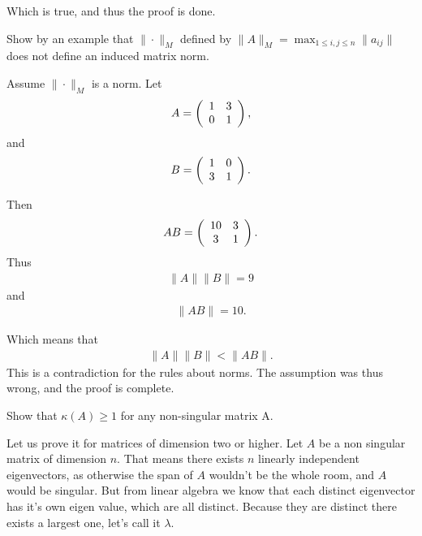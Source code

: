 \documentclass[10pt]{article}
\begin{document}
\begin{solution}[4]
Which is true, and thus the proof is done.
\end{solution}
\begin{exercise}[5]  \label{exe:5}
Show by an example that \(\| \cdot \| _{M}\) defined by
\(\| A \| _{M} = \max_{1\leq i,j \leq n} \| a _{ij} \|\) does not define an induced
matrix norm.
\end{exercise}
\begin{solution}[5]  \label{sol:5}
Assume \(\| \cdot \| _{M}\) is a norm.
Let
\begin{align*}
A =
\left( \begin{array}{c c}
1  &  3 \\
0  &  1 
\end{array} \right)
,
\end{align*}
and
\begin{align*}
B =
\left( \begin{array}{c c}
1  &  0 \\
3  &  1
\end{array} \right)
.
\end{align*}

Then
\begin{align*}
AB =
\left( \begin{array}{c c}
10  &  3 \\
3  &  1
\end{array} \right)
.
\end{align*}
Thus
\begin{align*}
\| A \| \| B \| = 9
\end{align*}
and
\begin{align*}
\| AB \| = 10
.
\end{align*}

Which means that
\begin{align*}
\| A \| \| B \| < \| AB \| 
.
\end{align*}
This is a contradiction for the rules about norms. The assumption
was thus wrong, and the proof is complete.
\end{solution}
\begin{exercise}[6]  \label{exe:6}
Show that \(\kappa(A) \geq 1\) for any non-singular matrix A.
\end{exercise}
\begin{solution}[6]  \label{sol:6}
Let us prove it for matrices of dimension two or higher.
Let \(A\) be a non singular matrix of dimension \(n\). That means there exists
\(n\) linearly independent eigenvectors, as otherwise the span of \(A\)
wouldn't be the whole room, and \(A\) would be singular. But from
linear algebra we know that each distinct eigenvector has it's own
eigen value, which are all distinct. Because they are distinct there exists
a largest one, let's call it \(\lambda\).
\end{solution}
\end{document}
